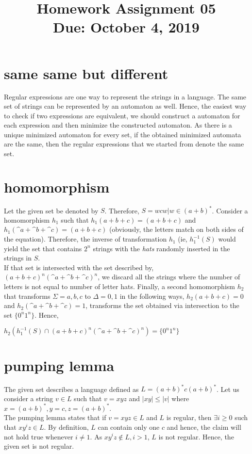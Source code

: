 \documentclass[11pt,letterpaper]{article}
\title{Homework Assignment 05 \\
    \small Due: October 4, 2019}
\begin{document}
\maketitle

\section{same same but different}
Regular expressions are one way to represent the strings in a language. The same set of strings can be represented by an automaton as well. Hence, the easiest way to check if two expressions are equivalent, we should construct a automaton for each expression and then minimize the constructed automaton. As there is a unique minimized automaton for every set, if the obtained minimized automata are the same, then the regular expressions that we started from denote the same set.

\section{homomorphism}
Let the given set be denoted by $S$. Therefore, $S = {wcw | w \in (a+b)^*}$. Consider a homomorphism $h_1$ such that $h_1(a+b+c)=(a+b+c)$ and $h_1(\^{a}+\^{b}+\^{c})=(a+b+c)$ (obviously, the letters match on both sides of the equation). Therefore, the inverse of transformation $h_1$ (ie, $h_1^{-1}(S)$ would yield the set that contains $2^n$ strings with the \textit{hats} randomly inserted in the strings in $S$. \\
If that set is intersected with the set described by, $(a+b+c)^n(\^{a}+\^{b}+\^{c})^n$, we discard all the strings where the number of letters is not equal to number of letter hats. Finally, a second homomorphism $h_2$ that  transforms $\Sigma = {a,b,c}$ to $\Delta = {0,1}$ in the following ways, $h_2(a+b+c)=0$ and $h_2(\^{a}+\^{b}+\^{c})=1$, transforms the set obtained via intersection to the set $\{0^n1^n\}$. Hence, 
\begin{center}
    $h_2(h_1^{-1}(S) \cap (a+b+c)^n(\^{a}+\^{b}+\^{c})^n) = \{0^n1^n\}$
\end{center}

\section{pumping lemma}
The given set describes a language defined as $L=(a+b)^*c(a+b)^*$. Let us consider a string $v \in L$ such that $v = xyz$ and $|xy| \leq |v|$ where $x=(a+b)^*,y=c,z=(a+b)^*$. \\
The pumping lemma states that if $v=xyz \in L$ and $L$ is regular, then $\exists i \geq 0$ such that $xy^iz \in L$. By definition, $L$ can contain only one $c$ and hence, the claim will not hold true whenever $i \neq 1$. As $xy^iz \notin L, i > 1$, $L$ is not regular. Hence, the given set is not regular.
\end{document}
